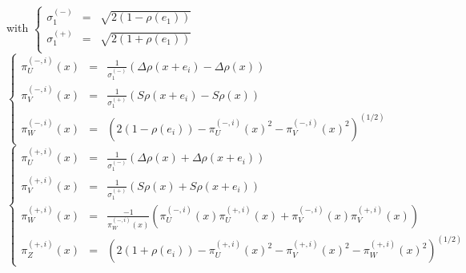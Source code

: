 \documentclass[12pt]{article}
\theoremstyle{Theorem}
\begin{document}
with 
$\left\{
 \begin{array}{rlc}
 \sigma^{\scriptscriptstyle (-)}_{1} & = &  \sqrt{2(1-\rho(e_1))} \\
 \sigma^{\scriptscriptstyle (+)}_{1} & = & \sqrt{2(1+\rho(e_1))} \\
 \end{array}\right.$ 
 $\left\{
 \begin{array}{rlc}
   \pi^{\scriptscriptstyle(-, i)}_{U}(x) & = & \frac{1}{\sigma^{\scriptscriptstyle (-)}_{1}}\left(\Delta \rho(x+e_i) -\Delta \rho(x)\right) \\
   \pi^{\scriptscriptstyle(-, i)}_{V}(x) & = &  \frac{1}{\sigma^{\scriptscriptstyle (+)}_{1}}\left(S\rho(x+e_i)-S\rho(x)\right)  \\
   \pi^{\scriptscriptstyle(-, i)}_{W}(x)& = & \left(2(1 - \rho(e_{i})) - \pi^{\scriptscriptstyle(-, i)}_{U}(x)^{2} - \pi^{\scriptscriptstyle(-, i)}_{V}(x)^{2}\right)^{\scriptscriptstyle (1/2)} \end{array}\right.$ \\
    $\left\{
 \begin{array}{rlc}
   \pi^{\scriptscriptstyle(+, i)}_{U}(x) & = &  \frac{1}{\sigma^{\scriptscriptstyle (-)}_{1}}\left(\Delta \rho(x) + \Delta \rho(x+e_i)\right) \\
    \pi^{\scriptscriptstyle(+, i)}_{V}(x) & = & \frac{1}{\sigma^{\scriptscriptstyle (+)}_{1}}\left(S \rho(x) + S\rho(x+e_i)\right) \\
     \pi^{\scriptscriptstyle(+, i)}_{W}(x) & = & \frac{-1}{\pi^{\scriptscriptstyle(-, i)}_{W}(x)}\left(\pi^{\scriptscriptstyle(-, i)}_{U}(x)\pi^{\scriptscriptstyle(+, i)}_{U}(x) + \pi^{\scriptscriptstyle(-, i)}_{V}(x)\pi^{\scriptscriptstyle(+, i)}_{V}(x)\right) \\
   \pi^{\scriptscriptstyle(+, i)}_{Z}(x)& = & \left(2(1 + \rho(e_i)) - \pi^{\scriptscriptstyle(+, i)}_{U}(x)^{2} - \pi^{\scriptscriptstyle(+, i)}_{V}(x)^{2} - \pi^{\scriptscriptstyle(+, i)}_{W}(x)^{2}\right)^{\scriptscriptstyle (1/2)}
\end{array}\right.$ 
\end{document}
